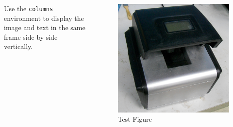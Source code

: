 \documentclass[
        ]{beamer}
\begin{document}
\begin{frame}[t]{\subsecname} %
    \begin{columns}
        Use the \texttt{columns} environment to display the image and text in the same frame side by side vertically.
        \begin{figure}
        \centering
        \includegraphics[width=\textwidth]{im/testim}
        \caption{Test Figure}
        \end{figure}
    \end{columns}
\end{frame}
\end{document}
